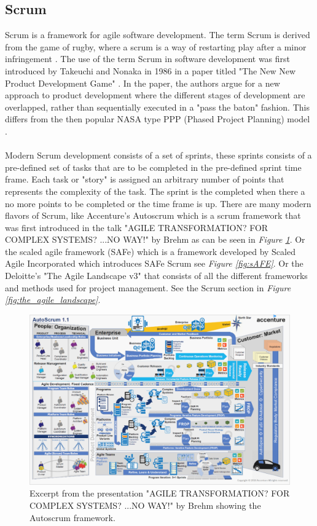 \documentclass[12pt]{article}
\begin{document}
\subsection{Scrum}
Scrum is a framework for agile software development. The term Scrum is derived 
from the game of rugby, where a scrum is a way of restarting play after a minor infringement \cite{ScrumRugbyUnion2025}.
The use of the term Scrum in software development was first introduced by Takeuchi and Nonaka in 1986 in a paper titled 
"The New New Product Development Game" \cite{NewNewProduct}.
In the paper, the authors argue for a new approach to product development where the different stages of development are 
overlapped, rather than sequentially executed in a "pass the baton" fashion. This differs from 
the then popular NASA type PPP (Phased Project Planning) model \cite{PhasedProjectPlanning1968}.
\\
\\
Modern Scrum development consists of a set of sprints, these sprints consists of a pre-defined set of tasks
that are to be completed in the pre-defined sprint time frame. Each task or "story" is assigned an arbitrary number of points
that represents the complexity of the task. The sprint is the completed when there a no more points to be completed or the time frame is up.
There are many modern flavors of Scrum, like Accenture's \cite{AccentureLetThere} Autoscrum
which is a scrum framework that was first introduced in the talk "AGILE TRANSFORMATION?
FOR COMPLEX SYSTEMS?
...NO WAY!" by Brehm \cite{brehmAGILETRANSFORMATIONCOMPLEX2025} as can be seen in \textit{Figure \ref{fig:autoscrum}}.
Or the scaled agile framework (SAFe) \cite{Framework} which is a framework developed by Scaled Agile Incorporated  which introduces 
SAFe Scrum see \textit{Figure \ref{fig:sAFE}}.
Or the Deloitte's \cite{DeloitteAuditConsulting} "The Agile Landscape v3" that consists 
of all the different frameworks and methods used for project management. See the Scrum section in \textit{Figure \ref{fig:the_agile_landscape}}.

\begin{figure}
  \centering
  \includegraphics[width=\textwidth]{autoscrum.png}
  \caption{Excerpt from the presentation "AGILE TRANSFORMATION? FOR COMPLEX SYSTEMS? ...NO WAY!" by Brehm \cite{brehmAGILETRANSFORMATIONCOMPLEX2025} showing the Autoscrum framework.}
  \label{fig:autoscrum}
\end{figure}
\end{document}
